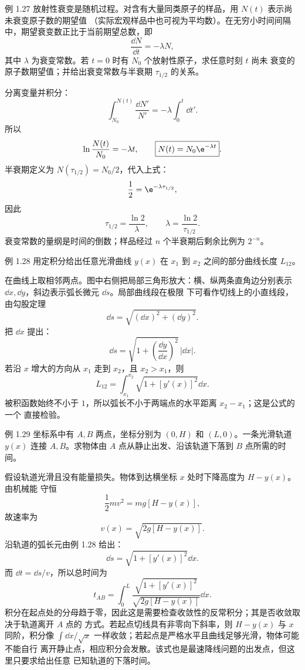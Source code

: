 \begin{origexamplebox}{例 1.27}
放射性衰变是随机过程。对含有大量同类原子的样品，用 $N(t)$ 表示尚未衰变原子数的期望值
（实际宏观样品中也可视为平均数）。在无穷小时间间隔中，期望衰变数正比于当前期望总数，即
\[
 \frac{\dd N}{\dd t}=-\lambda N,
\]
其中 $\lambda$ 为衰变常数。若 $t=0$ 时有 $N_0$ 个放射性原子，求任意时刻 $t$ 尚未
衰变的原子数期望值；并给出衰变常数与半衰期 $\tau_{1/2}$ 的关系。
\end{origexamplebox}

\begin{xesolution}
分离变量并积分：
\[
 \int_{N_0}^{N(t)}\frac{\dd N'}{N'}
 =-\lambda\int_0^t\dd t'.
\]
所以
\[
 \ln\frac{N(t)}{N_0}=-\lambda t,
 \qquad
 \boxed{N(t)=N_0\e^{-\lambda t}}.
\]
半衰期定义为 $N(\tau_{1/2})=N_0/2$，代入上式：
\[
 \frac12=\e^{-\lambda\tau_{1/2}},
\]
因此
\[
 \boxed{\tau_{1/2}=\frac{\ln2}{\lambda}},
 \qquad
 \boxed{\lambda=\frac{\ln2}{\tau_{1/2}}}.
\]
衰变常数的量纲是时间的倒数；样品经过 $n$ 个半衰期后剩余比例为 $2^{-n}$。
\end{xesolution}

\Needspace{0.36\textheight}
\begin{origexamplebox}{例 1.28}
用定积分给出任意光滑曲线 $y(x)$ 在 $x_1$ 到 $x_2$ 之间的部分曲线长度 $L_{12}$。
\arcLengthDiagram
\end{origexamplebox}

\begin{xesolution}
在曲线上取相邻两点。图中右侧把局部三角形放大：横、纵两条直角边分别表示
$\dd x,\dd y$，斜边表示弧长微元 $\dd s$。局部曲线段在极限
下可看作切线上的小直线段，由勾股定理
\[
 \dd s=\sqrt{(\dd x)^2+(\dd y)^2}.
\]
把 $\dd x$ 提出：
\[
 \dd s=\sqrt{1+\left(\frac{\dd y}{\dd x}\right)^2}\,|\dd x|.
\]
若沿 $x$ 增大的方向从 $x_1$ 走到 $x_2$，且 $x_2>x_1$，则
\[
 \boxed{L_{12}=\int_{x_1}^{x_2}
 \sqrt{1+[y'(x)]^2}\dd x}.
\]
被积函数始终不小于 $1$，所以弧长不小于两端点的水平距离 $x_2-x_1$；这是公式的一个
直接检验。
\end{xesolution}

\Needspace{0.39\textheight}
\begin{origexamplebox}{例 1.29}
坐标系中有 $A,B$ 两点，坐标分别为 $(0,H)$ 和 $(L,0)$。一条光滑轨道 $y(x)$ 连接
$A,B$。求物体由 $A$ 点从静止出发、沿该轨道下落到 $B$ 点所需的时间。
\trackTimeDiagram
\end{origexamplebox}

\begin{xesolution}
假设轨道光滑且没有能量损失。物体到达横坐标 $x$ 处时下降高度为 $H-y(x)$。由机械能
守恒
\[
 \frac12mv^2=mg[H-y(x)],
\]
故速率为
\[
 v(x)=\sqrt{2g[H-y(x)]}.
\]
沿轨道的弧长元由例 1.28 给出：
\[
 \dd s=\sqrt{1+[y'(x)]^2}\dd x.
\]
而 $\dd t=\dd s/v$，所以总时间为
\[
 \boxed{t_{AB}=\int_0^L
 \frac{\sqrt{1+[y'(x)]^2}}
 {\sqrt{2g[H-y(x)]}}\dd x}.
\]
\trackTimeSolutionDiagram
积分在起点处的分母趋于零，因此这是需要检查收敛性的反常积分；其是否收敛取决于轨道离开 $A$ 点的
方式。若起点切线具有非零向下斜率，则 $H-y(x)$ 与 $x$ 同阶，积分像
$\int\dd x/\sqrt{x}$ 一样收敛；若起点是严格水平且曲线足够光滑，物体可能不能自行
离开静止点，相应积分会发散。该式也是最速降线问题的出发点，但这里只要求给出任意
已知轨道的下落时间。
\end{xesolution}
